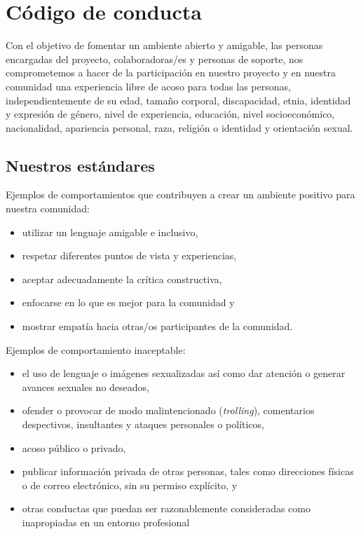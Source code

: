 \chapter{Código de conducta}\label{s:conduct}

Con el objetivo de fomentar un ambiente abierto y amigable, 
las personas encargadas del proyecto, colaboradoras/es y personas de soporte, 
nos comprometemos a hacer de la participación en nuestro proyecto
y en nuestra comunidad una experiencia libre de acoso para todas las personas,
independientemente de su edad, tamaño corporal, discapacidad, etnia,
identidad y expresión de género, nivel de experiencia, educación,
nivel socioeconómico, nacionalidad, apariencia personal, raza,
religión o identidad y orientación sexual.

\section*{Nuestros estándares}

Ejemplos de comportamientos que contribuyen a crear un ambiente positivo
para nuestra comunidad:

\begin{itemize}
\item
  utilizar un lenguaje amigable e inclusivo,
\item
  respetar diferentes puntos de vista y experiencias,
\item
  aceptar adecuadamente la crítica constructiva,
\item
 enfocarse en lo que es mejor para la comunidad y
\item
 mostrar empatía hacia otras/os participantes de la comunidad.
\end{itemize}

\noindent
Ejemplos de comportamiento inaceptable:

\begin{itemize}
\item
  el uso de lenguaje o imágenes sexualizadas así como  
  dar atención o generar avances sexuales no deseados,
\item
  ofender o provocar de modo malintencionado (\emph{trolling}), comentarios despectivos, insultantes y ataques personales o políticos,
\item
 acoso  público o privado,
\item
  publicar información privada de otras personas, tales como direcciones
  físicas o de correo electrónico, sin su permiso explícito, y
\item
  otras conductas que puedan ser razonablemente consideradas
  como inapropiadas en un entorno profesional
\end{itemize}

